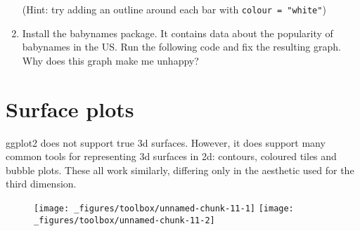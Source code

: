 \begin{enumerate}
  (Hint: try adding an outline around each bar with
  \texttt{colour\ =\ "white"})
\item
  Install the babynames package. It contains data about the popularity
  of babynames in the US. Run the following code and fix the resulting
  graph. Why does this graph make me unhappy?

\begin{Shaded}
\begin{Highlighting}[]
\StringTok{ }\NormalTok{)}
\StringTok{ }
\StringTok{  }\NormalTok{()}
\end{Highlighting}
\end{Shaded}
\end{enumerate}

\hypertarget{sec:surface}{\section{Surface plots}\label{sec:surface}}

ggplot2 does not support true 3d surfaces. However, it does support many
common tools for representing 3d surfaces in 2d: contours, coloured
tiles and bubble plots. These all work similarly, differing only in the
aesthetic used for the third dimension. 
  

\begin{Shaded}
\begin{Highlighting}[]
\StringTok{ }
\StringTok{  }\NormalTok{(}\NormalTok{(}  

\StringTok{ }
\StringTok{  }\NormalTok{(}\NormalTok{(} 
\end{Highlighting}
\end{Shaded}

\begin{figure}[H]
  \texttt{[image: \_figures/toolbox/unnamed-chunk-11-1]}%
  \texttt{[image: \_figures/toolbox/unnamed-chunk-11-2]}
\end{figure}

